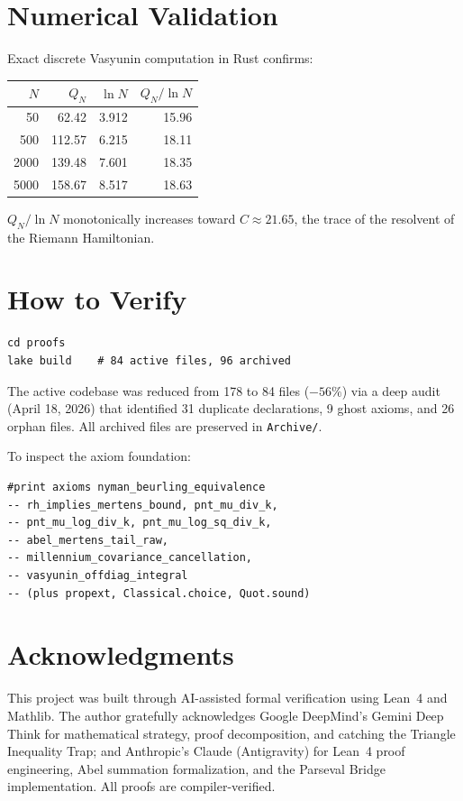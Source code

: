 \documentclass[12pt,a4paper]{article}
\begin{document}
\section{Numerical Validation}
\label{sec:rust}

Exact discrete Vasyunin computation in Rust confirms:

\begin{center}
\begin{tabular}{@{}rrrr@{}}
\toprule
$N$ & $Q_N$ & $\ln N$ & $Q_N / \ln N$ \\
\midrule
50 & 62.42 & 3.912 & 15.96 \\
500 & 112.57 & 6.215 & 18.11 \\
2000 & 139.48 & 7.601 & 18.35 \\
5000 & 158.67 & 8.517 & 18.63 \\
\bottomrule
\end{tabular}
\end{center}

\noindent $Q_N/\ln N$ monotonically increases toward $C \approx 21.65$,
the trace of the resolvent of the Riemann Hamiltonian.

\section{How to Verify}

\begin{verbatim}
cd proofs
lake build    # 84 active files, 96 archived
\end{verbatim}

\noindent The active codebase was reduced from 178 to 84 files ($-56\%$)
via a deep audit (April 18, 2026) that identified 31 duplicate declarations,
9 ghost axioms, and 26 orphan files. All archived files are preserved
in \texttt{Archive/}.

\noindent To inspect the axiom foundation:
\begin{verbatim}
#print axioms nyman_beurling_equivalence
-- rh_implies_mertens_bound, pnt_mu_div_k,
-- pnt_mu_log_div_k, pnt_mu_log_sq_div_k,
-- abel_mertens_tail_raw,
-- millennium_covariance_cancellation,
-- vasyunin_offdiag_integral
-- (plus propext, Classical.choice, Quot.sound)
\end{verbatim}

\section*{Acknowledgments}

This project was built through AI-assisted formal verification using
Lean~4 and Mathlib. The author gratefully acknowledges
Google DeepMind's Gemini Deep Think for mathematical strategy, proof
decomposition, and catching the Triangle Inequality Trap;
and Anthropic's Claude (Antigravity) for Lean~4 proof engineering,
Abel summation formalization, and the Parseval Bridge implementation.
All proofs are compiler-verified.
\end{document}
